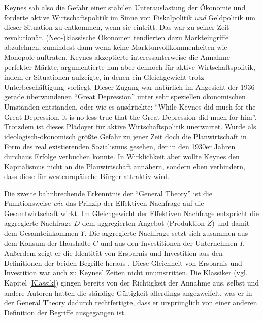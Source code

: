 Keynes sah also die Gefahr einer stabilen Unterauslastung der Ökonomie und forderte aktive Wirtschaftspolitik im Sinne von Fiskalpolitik \textit{und} Geldpolitik um dieser Situation zu entkommen, wenn sie eintritt. Das war zu seiner Zeit revolutionär. (Neo-)klassische Ökonomen tendierten dazu Markteingriffe abzulehnen, zumindest dann wenn keine Marktunvollkommenheiten wie Monopole auftraten. Keynes akzeptierte interessanterweise die Annahme perfekter Märkte, argumentierte nun aber dennoch für aktive Wirtschaftspolitik, indem er Situationen aufzeigte, in denen ein Gleichgewicht trotz Unterbeschäftigung vorliegt. Dieser Zugang war natürlich im Angesicht der 1936 gerade überwundenen "`Great Depression"' unter sehr speziellen ökonomischen Umständen entstanden, oder wie \textcite[S. 199]{Samuelson1946} es ausdrückte: "`While Keynes did much for the Great Depression, it is no less true that the Great Depression did much for him"'. Trotzdem ist dieses Plädoyer für aktive Wirtschaftspolitik unerwartet. Wurde als ideologisch-ökonomisch größte Gefahr zu jener Zeit doch die Planwirtschaft in Form des real existierenden Sozialismus gesehen, der in den 1930er Jahren durchaus Erfolge verbuchen konnte. In Wirklichkeit aber wollte Keynes den Kapitalismus nicht an die Planwirtschaft annähern, sondern eben verhindern, dass diese für westeuropäische Bürger attraktiv wird.

Die zweite bahnbrechende Erkenntnis der "`General Theory"' ist die Funktionsweise \textit{wie} das Prinzip der Effektiven Nachfrage auf die Gesamtwirtschaft wirkt. Im Gleichgewicht der Effektiven Nachfrage entspricht die aggregierte Nachfrage $D$ dem aggregierten Angebot (Produktion $Z$) und damit dem Gesamteinkommen $Y$. Die aggregierte Nachfrage setzt sich zusammen aus dem Konsum der Haushalte $C$ und aus den Investitionen der Unternehmen $I$. Außerdem zeigt er die Identität von Ersparnis und Investition aus den Definitionen der beiden Begriffe heraus \parencite[S. 63]{Keynes1936}. Diese Gleichheit von Ersparnis und Investition war auch zu Keynes' Zeiten nicht unumstritten. Die Klassiker (vgl. Kapitel \ref{Klassik}) gingen bereits von der Richtigkeit der Annahme aus, \textcite{Keynes1930} selbst und andere Autoren hatten die ständige Gültigkeit allerdings angezweifelt, was er in der General Theory \parencite[S. 74ff]{Keynes1936} dadurch rechtfertigte, dass er ursprünglich von einer anderen Definition der Begriffe ausgegangen ist.


